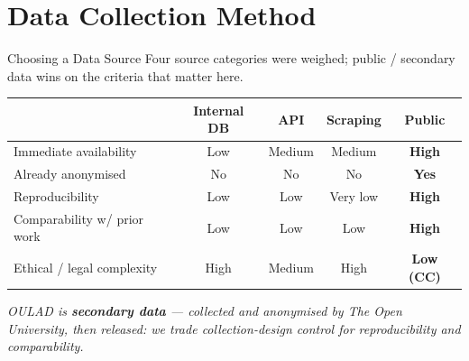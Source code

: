\documentclass[aspectratio=169,10pt]{beamer}
\newcommand{\hc}[1]{{\bfseries\color{white}#1}}
\newcommand{\takeaway}[1]{\vspace{2pt}\par{\footnotesize\itshape #1}}
\begin{document}
\section{Data Collection Method}
\begin{frame}{Choosing a Data Source}
  {\footnotesize Four source categories were weighed; \textcolor{ccnured}{public / secondary data} wins on the criteria that matter here.}
  \vspace{3pt}
  {\footnotesize
  \setlength{\tabcolsep}{6pt}\renewcommand{\arraystretch}{1.3}
  \begin{tabularx}{\textwidth}{@{}>{\raggedright\arraybackslash}p{4.0cm} c c c >{\columncolor{rowtint}}c@{}}
    \toprule
    \rowcolor{ccnured}\hc{Criterion} & \hc{Internal DB} & \hc{API} & \hc{Scraping} & \hc{Public}\\
    \midrule
    Immediate availability & Low & Medium & Medium & \textbf{High}\\
    Already anonymised & No & No & No & \textbf{Yes}\\
    Reproducibility & Low & Low & Very low & \textbf{High}\\
    Comparability w/ prior work & Low & Low & Low & \textbf{High}\\
    Ethical / legal complexity & High & Medium & High & \textbf{Low (CC)}\\
    \bottomrule
  \end{tabularx}}
  \takeaway{OULAD is \textbf{secondary data} — collected and anonymised by The Open University, then released: we trade collection-design control for reproducibility and comparability.}
\end{frame}
\end{document}
